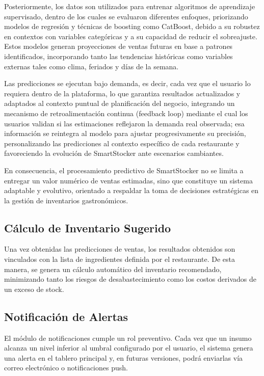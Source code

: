 Posteriormente, los datos son utilizados para entrenar algoritmos de aprendizaje supervisado, dentro de los cuales se evaluaron diferentes enfoques, priorizando modelos de regresión y técnicas de boosting como CatBoost, debido a su robustez en contextos con variables categóricas y a su capacidad de reducir el sobreajuste. Estos modelos generan proyecciones de ventas futuras en base a patrones identificados, incorporando tanto las tendencias históricas como variables externas tales como clima, feriados y días de la semana.

Las predicciones se ejecutan bajo demanda, es decir, cada vez que el usuario lo requiera dentro de la plataforma, lo que garantiza resultados actualizados y adaptados al contexto puntual de planificación del negocio, integrando un mecanismo de retroalimentación continua (feedback loop) mediante el cual los usuarios validan si las estimaciones reflejaron la demanda real observada; esa información se reintegra al modelo para ajustar progresivamente su precisión, personalizando las predicciones al contexto específico de cada restaurante y favoreciendo la evolución de SmartStocker ante escenarios cambiantes.

En consecuencia, el procesamiento predictivo de SmartStocker no se limita a entregar un valor numérico de ventas estimadas, sino que constituye un sistema adaptable y evolutivo, orientado a respaldar la toma de decisiones estratégicas en la gestión de inventarios gastronómicos.

\subsection{Cálculo de Inventario Sugerido}\label{sec:calculo-inventario}

Una vez obtenidas las predicciones de ventas, los resultados obtenidos son vinculados con la lista de ingredientes definida por el restaurante. De esta manera, se genera un cálculo automático del inventario recomendado, minimizando tanto los riesgos de desabastecimiento como los costos derivados de un exceso de stock. 

\subsection{Notificación de Alertas}\label{sec:alertas}

El módulo de notificaciones cumple un rol preventivo. Cada vez que un insumo alcanza un nivel inferior al umbral configurado por el usuario, el sistema genera una alerta en el tablero principal y, en futuras versiones, podrá enviarlas vía correo electrónico o notificaciones push.

